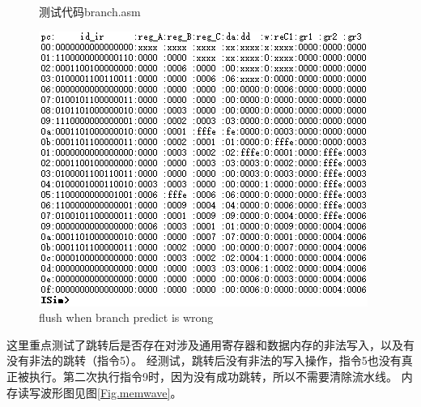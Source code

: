 \documentclass[10pt,a4paper,fleqn]{article}
\begin{document}
\begin{figure}[H]
  \begin{minipage}{0.32\textwidth}
    测试代码branch.asm
    
  \end{minipage}
  \hspace{1em}
  \begin{minipage}{0.65\textwidth}
    \centering
    \includegraphics[width=\textwidth]{figure/simu/branchtest.png}
    \caption{flush when branch predict is wrong}
  \end{minipage}
\end{figure}
\par 这里重点测试了跳转后是否存在对涉及通用寄存器和数据内存的非法写入，以及有没有非法的跳转（指令5）。
经测试，跳转后没有非法的写入操作，指令5也没有真正被执行。第二次执行指令9时，因为没有成功跳转，所以不需要清除流水线。
内存读写波形图见图\ref{Fig.memwave}。
\end{document}
